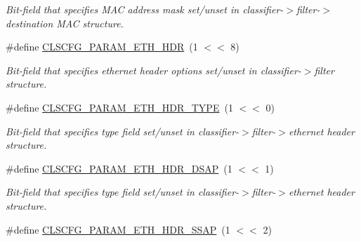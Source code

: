 \begin{DoxyCompactItemize}
\begin{DoxyCompactList}\small\item\em Bit-\/field that specifies M\-A\-C address mask set/unset in classifier-\/$>$filter-\/$>$destination M\-A\-C structure. \end{DoxyCompactList}\item 
\hypertarget{group__FAPI__QOS__CLASS_gaa023578b2f6ba2c92206f9a0c956800e}{\#define \hyperlink{group__FAPI__QOS__CLASS_gaa023578b2f6ba2c92206f9a0c956800e}{C\-L\-S\-C\-F\-G\-\_\-\-P\-A\-R\-A\-M\-\_\-\-E\-T\-H\-\_\-\-H\-D\-R}~(1 $<$$<$ 8)}\label{group__FAPI__QOS__CLASS_gaa023578b2f6ba2c92206f9a0c956800e}

\begin{DoxyCompactList}\small\item\em Bit-\/field that specifies ethernet header options set/unset in classifier-\/$>$filter structure. \end{DoxyCompactList}\item 
\hypertarget{group__FAPI__QOS__CLASS_ga3a634002ae24673cab216f1a95fb0358}{\#define \hyperlink{group__FAPI__QOS__CLASS_ga3a634002ae24673cab216f1a95fb0358}{C\-L\-S\-C\-F\-G\-\_\-\-P\-A\-R\-A\-M\-\_\-\-E\-T\-H\-\_\-\-H\-D\-R\-\_\-\-T\-Y\-P\-E}~(1 $<$$<$ 0)}\label{group__FAPI__QOS__CLASS_ga3a634002ae24673cab216f1a95fb0358}

\begin{DoxyCompactList}\small\item\em Bit-\/field that specifies type field set/unset in classifier-\/$>$filter-\/$>$ethernet header structure. \end{DoxyCompactList}\item 
\hypertarget{group__FAPI__QOS__CLASS_ga306a9085f7f3faba2b6b75cdcf3243a8}{\#define \hyperlink{group__FAPI__QOS__CLASS_ga306a9085f7f3faba2b6b75cdcf3243a8}{C\-L\-S\-C\-F\-G\-\_\-\-P\-A\-R\-A\-M\-\_\-\-E\-T\-H\-\_\-\-H\-D\-R\-\_\-\-D\-S\-A\-P}~(1 $<$$<$ 1)}\label{group__FAPI__QOS__CLASS_ga306a9085f7f3faba2b6b75cdcf3243a8}

\begin{DoxyCompactList}\small\item\em Bit-\/field that specifies type field set/unset in classifier-\/$>$filter-\/$>$ethernet header structure. \end{DoxyCompactList}\item 
\hypertarget{group__FAPI__QOS__CLASS_gad097dc1979245aeaab1e242f5c5c34ee}{\#define \hyperlink{group__FAPI__QOS__CLASS_gad097dc1979245aeaab1e242f5c5c34ee}{C\-L\-S\-C\-F\-G\-\_\-\-P\-A\-R\-A\-M\-\_\-\-E\-T\-H\-\_\-\-H\-D\-R\-\_\-\-S\-S\-A\-P}~(1 $<$$<$ 2)}\label{group__FAPI__QOS__CLASS_gad097dc1979245aeaab1e242f5c5c34ee}


\end{DoxyCompactItemize}
